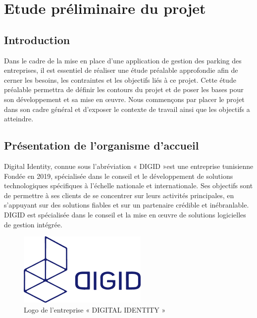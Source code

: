 

\chapter { Etude préliminaire du projet }


\section*{Introduction}
\bigskip
Dans le cadre de la mise en place d'une application de gestion des parking des entreprises, il est essentiel de réaliser une étude préalable approfondie afin de cerner les besoins, les contraintes et les objectifs liés à ce projet. Cette étude préalable permettra de définir les contours du projet et de poser les bases pour son développement et sa mise en œuvre.
Nous commençons par placer le projet dans son cadre général et d'exposer le contexte de travail ainsi que  les objectifs a atteindre.


\section{Présentation de l’organisme d’accueil}
\bigskip
Digital Identity, connue sous l’abréviation « DIGID »est une entreprise tunisienne Fondée en 2019, spécialisée dans le conseil et le développement de solutions technologiques spécifiques à l'échelle nationale et internationale. Ses objectifs sont de permettre à ses clients de se concentrer sur leurs activités principales, en s'appuyant sur des solutions fiables et sur un partenaire crédible et inébranlable.\\
\newline DIGID est spécialisée dans le conseil et la mise en œuvre de solutions logicielles de gestion intégrée.

\bigskip
\begin{figure}[ht]
    \centering
    \includegraphics[scale = 0.5]{chap1.images/digidlogo.png}
    \caption{Logo de l’entreprise « DIGITAL IDENTITY »}
    \label{Logo de l’entreprise « DIGITAL IDENTITY » }
\end{figure}

